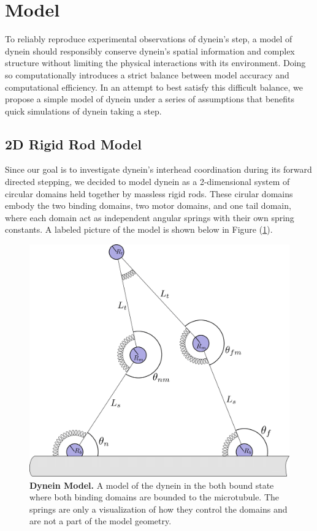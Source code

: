 \section{Model}
To reliably reproduce experimental observations of dynein's step, a model of dynein should responsibly conserve dynein's spatial information and complex structure without limiting the physical interactions with its environment. Doing so computationally introduces a strict balance between model accuracy and computational efficiency. In an attempt to best satisfy this difficult balance, we propose a simple model of dynein under a series of assumptions that benefits quick simulations of dynein taking a step. 


\subsection{2D Rigid Rod Model}
Since our goal is to investigate dynein's interhead coordination during its forward directed stepping, we decided to model dynein as a 2-dimensional system of circular domains held together by massless rigid rods. These cirular domains embody the two binding domains, two motor domains, and one tail domain, where each domain act as independent angular springs with their own spring constants. A labeled picture of the model is shown below in Figure (\ref{fig:model}). 

\begin{figure}[H]
	\centering
	\includegraphics[width=0.6\columnwidth]{Figures/model-cartoon.png}
	\caption[Dynein Model]{\textbf{Dynein Model.} A model of the dynein in the both bound state where both binding domains are bounded to the microtubule. The springs are only a visualization of how they control the domains and are not a part of the model geometry. \cite{Capek2017}}
	\label{fig:model}
\end{figure}

